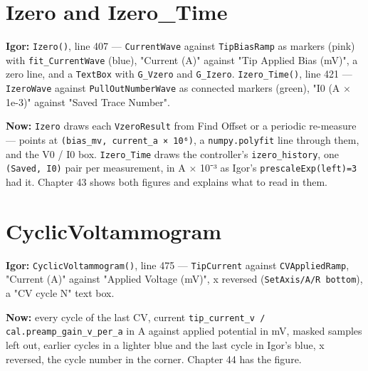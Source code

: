 \section{Izero and Izero\_Time}

\textbf{Igor:} \texttt{Izero()}, line 407 --- \texttt{Current\discretionary{}{}{}Wave} against \texttt{Tip\discretionary{}{}{}Bias\discretionary{}{}{}Ramp} as markers (pink) with \texttt{fit\_\discretionary{}{}{}Current\discretionary{}{}{}Wave} (blue), "Current (\textmu{}A)" against "Tip Applied Bias (mV)", a zero line, and a \texttt{Text\discretionary{}{}{}Box} with \texttt{G\_\discretionary{}{}{}Vzero} and \texttt{G\_\discretionary{}{}{}Izero}. \texttt{Izero\_\discretionary{}{}{}Time()}, line 421 --- \texttt{Izero\discretionary{}{}{}Wave} against \texttt{Pull\discretionary{}{}{}Out\discretionary{}{}{}Number\discretionary{}{}{}Wave} as connected markers (green), "I0 (\textmu{}A $\times$ 1e-3)" against "Saved Trace Number".

\textbf{Now:} \texttt{Izero} draws each \texttt{Vzero\discretionary{}{}{}Result} from Find Offset or a periodic re-measure --- points at \texttt{(bias\_\discretionary{}{}{}mv,\discretionary{}{}{} current\_\discretionary{}{}{}a × 10⁶)}, a \texttt{numpy.\discretionary{}{}{}polyfit} line through them, and the V0 / I0 box. \texttt{Izero\_\discretionary{}{}{}Time} draws the controller's \texttt{izero\_\discretionary{}{}{}history}, one \texttt{(Saved,\discretionary{}{}{} I0)} pair per measurement, in \textmu{}A $\times$ 10⁻³ as Igor's \texttt{prescale\discretionary{}{}{}Exp(left)=3} had it. Chapter 43 shows both figures and explains what to read in them.

\section{CyclicVoltammogram}

\textbf{Igor:} \texttt{Cyclic\discretionary{}{}{}Voltammogram()}, line 475 --- \texttt{Tip\discretionary{}{}{}Current} against \texttt{CVApplied\discretionary{}{}{}Ramp}, "Current (\textmu{}A)" against "Applied Voltage (mV)", x reversed (\texttt{Set\discretionary{}{}{}Axis/\discretionary{}{}{}A/\discretionary{}{}{}R bottom}), a "CV cycle N" text box.

\textbf{Now:} every cycle of the last CV, current \texttt{tip\_\discretionary{}{}{}current\_\discretionary{}{}{}v /\discretionary{}{}{} cal.\discretionary{}{}{}preamp\_\discretionary{}{}{}gain\_\discretionary{}{}{}v\_\discretionary{}{}{}per\_\discretionary{}{}{}a} in \textmu{}A against applied potential in mV, masked samples left out, earlier cycles in a lighter blue and the last cycle in Igor's blue, x reversed, the cycle number in the corner. Chapter 44 has the figure.

